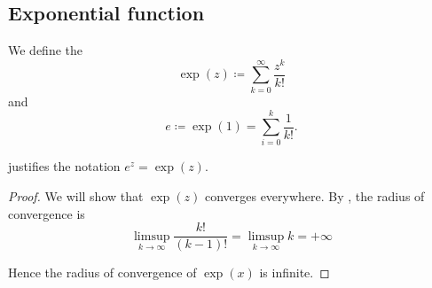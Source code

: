 \subsection{Exponential function}\label{subsec:exponential_function}

\begin{definition}\label{def:exponential_function}
  We define the 
  \begin{equation}\label{def:exponential_function/series}
    \exp(z) \coloneqq \sum_{k=0}^\infty \frac {z^k} {k!}
  \end{equation}
  and 
  \begin{equation*}
    e \coloneqq \exp(1) = \sum_{i=0}^k \frac 1 {k!}.
  \end{equation*}

   justifies the notation \( e^z = \exp(z) \).
\end{definition}
\begin{proof}
  We will show that \( \exp(z) \) converges everywhere. By , the radius of convergence is
  \begin{equation*}
    \limsup_{k \to \infty} \frac {k!} {(k-1)!}
    =
    \limsup_{k \to \infty} k
    =
    +\infty
  \end{equation*}

  Hence the radius of convergence of \( \exp(x) \) is infinite.
\end{proof}

